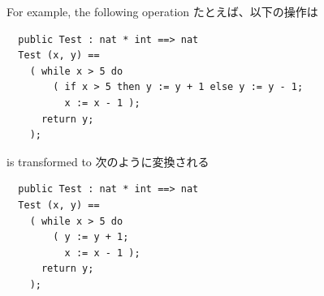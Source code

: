 \documentclass[\pformat,12pt]{jarticle}
\begin{document}
For example, the following operation
たとえば、以下の操作は
\begin{verbatim}
  public Test : nat * int ==> nat
  Test (x, y) ==
    ( while x > 5 do
        ( if x > 5 then y := y + 1 else y := y - 1; 
          x := x - 1 );
      return y;
    );
\end{verbatim}
is transformed to
次のように変換される
\begin{verbatim}
  public Test : nat * int ==> nat
  Test (x, y) ==
    ( while x > 5 do
        ( y := y + 1; 
          x := x - 1 );
      return y;
    );

\end{verbatim}



\end{document}
